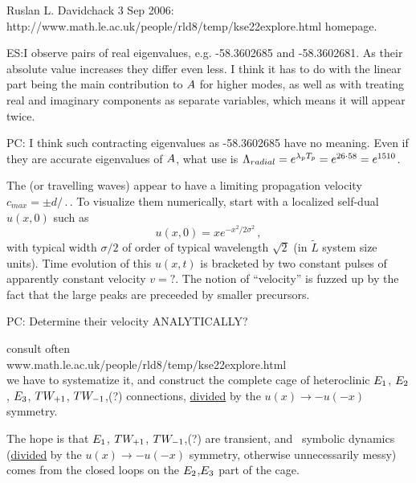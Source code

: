 Ruslan L. Davidchack 3 Sep 2006:
http://www.math.le.ac.uk/people/rld8/temp/kse22explore.html homepage.


ES:{I observe pairs of real eigenvalues,
e.g. -58.3602685 and -58.3602681. As their absolute
value increases they differ even less.
I think it has to do with the linear part being the main
contribution to $A$ for higher modes, as well as
with treating real and imaginary components
as separate variables, which means it will appear twice.
        }

PC: {I think such contracting eigenvalues as -58.3602685 have no meaning.
Even if they are accurate eigenvalues of $A$,
what use is
$\Lambda_{radial} =  e^{\lambda_p {T_{p}}} = e^{26\cdot58} = e^{1510}$.
        }

The \reqva (or travelling waves) appear to have a limiting propagation
velocity $c_{max} = \pm d/\period{}$.
To visualize them numerically,
start with a localized self-dual $u(x,0)$ such as
\[
u(x,0) = x e^{- x^2/2\sigma^2}
\,,
\]
with typical width $\sigma/2$ of order of typical wavelength
$\sqrt{2}$ (in $\tilde{L}$ system size units).
Time evolution of this  $u(x,t)$ is bracketed by two constant
pulses of apparently constant velocity $v=?$.
The notion of ``velocity''
is fuzzed up by the fact that the large peaks are preceeded
by smaller precursors.

PC: {Determine their velocity ANALYTICALLY?}

consult often
\\
        www.math.le.ac.uk/people/rld8/temp/kse22explore.html
\\
we have to systematize it, and
construct the complete cage of heteroclinic $E_{1}$, $E_{2}$, $E_{3}$,
$TW_{+1}$,
$TW_{-1}$,(?)
connections, \underline{divided} by the $u(x) \to - u(-x)$ symmetry.

The hope is that $E_{1}$,
$TW_{+1}$,
$TW_{-1}$,(?) are transient, and \rpo\ symbolic
dynamics (\underline{divided} by the $u(x) \to - u(-x)$ symmetry, otherwise
unnecessarily messy) comes from the closed loops on
the $E_{2}$,$E_{3}$ part of the cage.



